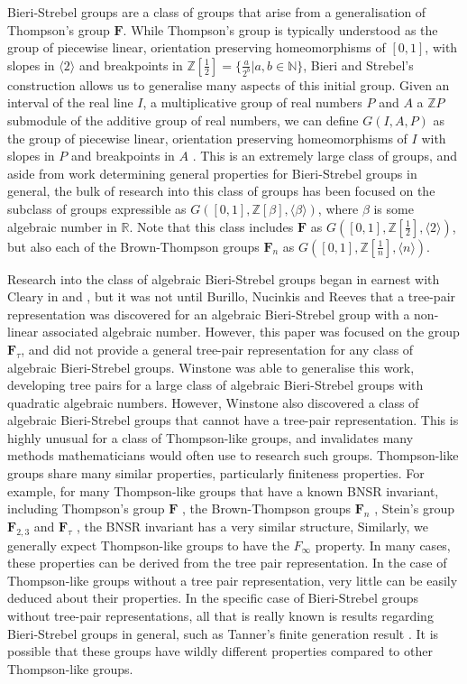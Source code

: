 \documentclass[
11pt, %
english, %
singlespacing, %
parskip, %
headsepline, %
]{amsart} %
\theoremstyle{definition}
\newcommand{\TF}{\textbf{F}}
\newcommand{\FN}[1]{$\textbf{F}_{#1}$}
\begin{document}
Bieri-Strebel groups are a class of groups that arise from a generalisation of Thompson's group $\TF$. While Thompson's group is typically understood as the group of piecewise linear, orientation preserving homeomorphisms of $[0,1]$, with slopes in $\langle 2 \rangle$ and breakpoints in $\mathbb{Z}[\frac{1}{2}] =\{ \frac{a}{2^b} | a,b \in \mathbb{N}\}$, Bieri and Strebel's construction allows us to generalise many aspects of this initial group. Given an interval of the real line $I$, a multiplicative group of real numbers $P$ and $A$ a $\mathbb{Z}P$ submodule of the additive group of real numbers, we can define $G(I,A,P)$ as the group of piecewise linear, orientation preserving homeomorphisms of $I$ with slopes in $P$ and breakpoints in $A$ \cite{BSgroups}. This is an extremely large class of groups, and aside from work determining general properties for Bieri-Strebel groups in general, the bulk of research into this class of groups has been focused on the subclass of groups expressible as $G([0,1], \mathbb{Z}[\beta], \langle \beta \rangle)$, where $\beta$ is some algebraic number in $\mathbb{R}$. Note that this class includes $\TF$ as $G([0,1], \mathbb{Z}[\frac{1}{2}], \langle 2 \rangle)$, but also each of the Brown-Thompson groups \FN{n} as $G([0,1], \mathbb{Z}[\frac{1}{n}], \langle n \rangle)$.

Research into the class of algebraic Bieri-Strebel groups began in earnest with Cleary in \cite{poset} and \cite{Cleary}, but it was not until Burillo, Nucinkis and Reeves \cite{Ftau} that a tree-pair representation was discovered for an algebraic Bieri-Strebel group with a non-linear associated algebraic number. However, this paper was focused on the group \FN{\tau}, and did not provide a general tree-pair representation for any class of algebraic Bieri-Strebel groups. Winstone \cite{Winstone} was able to generalise this work, developing tree pairs for a large class of algebraic Bieri-Strebel groups with quadratic algebraic numbers. However, Winstone also discovered a class of algebraic Bieri-Strebel groups that cannot have a tree-pair representation. This is highly unusual for a class of Thompson-like groups, and invalidates many methods mathematicians would often use to research such groups. Thompson-like groups share many similar properties, particularly finiteness properties. For example, for many Thompson-like groups that have a known BNSR invariant, including Thompson's group $\TF$ \cite{SigmaF}, the Brown-Thompson groups \FN{n} \cite{Fn} \cite{Zaremsky}, Stein's group \FN{2,3} \cite{F23} and \FN{\tau} \cite{Mine}, the BNSR invariant has a very similar structure, Similarly, we generally expect Thompson-like groups to have the $F_\infty$ property. In many cases, these properties can be derived from the tree pair representation. In the case of Thompson-like groups without a tree pair representation, very little can be easily deduced about their properties. In the specific case of Bieri-Strebel groups without tree-pair representations, all that is really known is results regarding Bieri-Strebel groups in general, such as Tanner's finite generation result \cite{Tanner}. It is possible that these groups have wildly different properties compared to other Thompson-like groups. 
\end{document}
